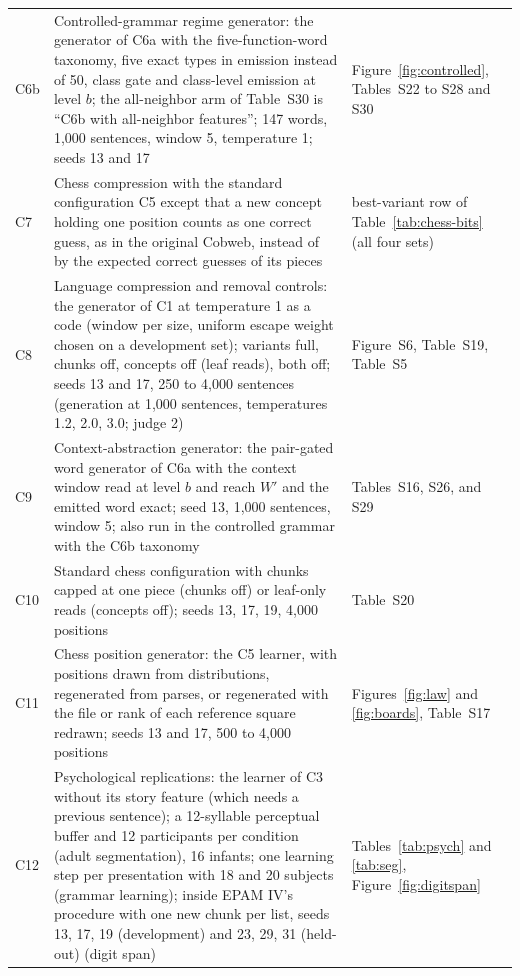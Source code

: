 \documentclass[11pt,letterpaper]{article}
\begin{document}
\begin{table}[h]
\begin{center}
\begin{tabular}{p{}p{}p{}}
C6b & Controlled-grammar regime generator: the generator of C6a with the five-function-word taxonomy, five exact types in emission instead of 50, class gate and class-level emission at level $b$; the all-neighbor arm of Table~S30 is ``C6b with all-neighbor features''; 147 words, 1,000 sentences, window 5, temperature 1; seeds 13 and 17 & Figure~\ref{fig:controlled}, Tables~S22 to S28 and S30 \\
C7 & Chess compression with the standard configuration C5 except that a new concept holding one position counts as one correct guess, as in the original Cobweb, instead of by the expected correct guesses of its pieces & best-variant row of Table~\ref{tab:chess-bits} (all four sets) \\
C8 & Language compression and removal controls: the generator of C1 at temperature 1 as a code (window per size, uniform escape weight chosen on a development set); variants full, chunks off, concepts off (leaf reads), both off; seeds 13 and 17, 250 to 4,000 sentences (generation at 1,000 sentences, temperatures 1.2, 2.0, 3.0; judge 2) & Figure~S6, Table~S19, Table~S5 \\
C9 & Context-abstraction generator: the pair-gated word generator of C6a with the context window read at level $b$ and reach $W'$ and the emitted word exact; seed 13, 1,000 sentences, window 5; also run in the controlled grammar with the C6b taxonomy & Tables~S16, S26, and S29 \\
C10 & Standard chess configuration with chunks capped at one piece (chunks off) or leaf-only reads (concepts off); seeds 13, 17, 19, 4,000 positions & Table~S20 \\
C11 & Chess position generator: the C5 learner, with positions drawn from distributions, regenerated from parses, or regenerated with the file or rank of each reference square redrawn; seeds 13 and 17, 500 to 4,000 positions & Figures~\ref{fig:law} and \ref{fig:boards}, Table~S17 \\
C12 & Psychological replications: the learner of C3 without its story feature (which needs a previous sentence); a 12-syllable perceptual buffer and 12 participants per condition (adult segmentation), 16 infants; one learning step per presentation with 18 and 20 subjects (grammar learning); inside EPAM IV's procedure with one new chunk per list, seeds 13, 17, 19 (development) and 23, 29, 31 (held-out) (digit span) & Tables~\ref{tab:psych} and \ref{tab:seg}, Figure~\ref{fig:digitspan} \\

\end{tabular}
\end{center}
\end{table}
\end{document}
